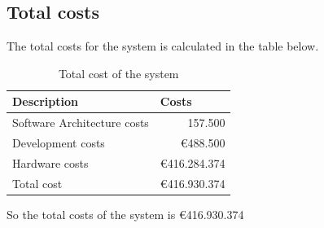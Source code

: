 \subsection{Total costs}
The total costs for the system is calculated in the table below.\\

\begin{table}[H]

	\centering
	\begin{tabular}{lr}
	\toprule
	\textbf{Description} & \multicolumn{1}{l}{\textbf{Costs}} \\ \hline
	Software Architecture costs & \EUR{}157.500\\
	Development costs & $\euro{}$488.500\\
	Hardware costs & $\euro{}$416.284.374\\
	Total cost & $\euro{}$416.930.374\\
	\bottomrule
	\end{tabular}
	\caption{Total cost of the system}
	\label{table:totalcosts}
\end{table}
So the total costs of the system is \euro{}416.930.374\\


